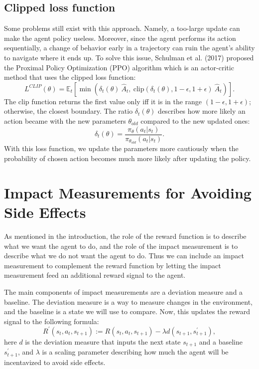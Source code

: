 \documentclass[12pt,A4]{report}
\theoremstyle{definition}
\begin{document}
\subsection{Clipped loss function}
Some problems still exist with this approach. Namely, a too-large update can make the agent policy useless. Moreover, since the agent performs its action sequentially, a change of behavior early in a trajectory can ruin the agent's ability to navigate where it ends up. To solve this issue, Schulman et al. (2017) proposed the Proximal Policy Optimization (PPO) algorithm which is an actor-critic method that uses the clipped loss function:
\[L^{CLIP}(\theta) = \mathbb{E}_t \left [ \min(\delta_t(\theta) \ \hat{A}_t,\ 
\text{clip}(\delta_t(\theta), 1 - \epsilon, 1 + \epsilon) \ \hat{A}_t) \right ]. \]
The clip function returns the first value only iff it is in the range $(1-\epsilon, 1+\epsilon)$; otherwise, the closest boundary. The ratio $\delta_t(\theta)$ describes how more likely an action became with the new parameters $\theta_{old}$ compared to the new updated ones:
\[ \delta_t(\theta) = \frac{\pi_\theta(a_t| s_t)}{\pi_{\theta_{old}}(a_t|s_t)}. \]
With this loss function, we update the parameters more cautiously when the probability of chosen action becomes much more likely after updating the policy.


\section{Impact Measurements for Avoiding Side Effects}

As mentioned in the introduction, the role of the reward function is to describe what we want the agent to do, and the role of the impact measurement is to describe what we do not want the agent to do. Thus we can include an impact measurement to complement the reward function by letting the impact measurement feed an additional reward signal to the agent.

The main components of impact measurements are a deviation measure and a baseline. The deviation measure is a way to measure changes in the environment, and the baseline is a state we will use to compare. Now, this updates the reward signal to the following formula:
\[ R^\prime(s_t, a_t, s_{t+1}) := R(s_t, a_t, s_{t+1}) - \lambda d(s_{t+1
}, s_{t+1}^\prime), \]
here $d$ is the deviation measure that inputs the next state $s_{t+1}$ and a baseline $s_{t+1}^\prime$, and $\lambda$ is a scaling parameter describing how much the agent will be incentavized to avoid side effects.
\end{document}
